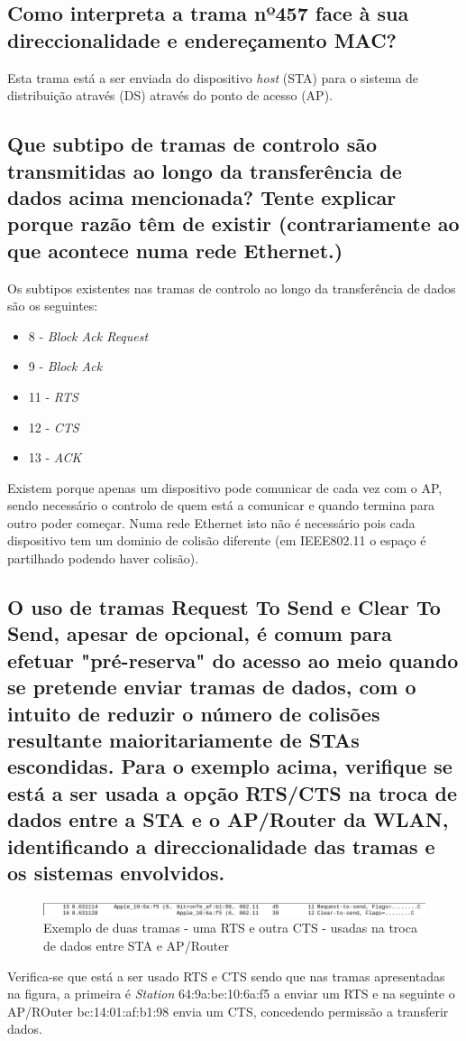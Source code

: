 \documentclass[a4paper]{article}
\begin{document}
\subsection{Como interpreta a trama nº457 face à sua direccionalidade e endereçamento
MAC?}
Esta trama está a ser enviada do dispositivo \textit{host} (STA) para o sistema de distribuição através (DS) através do ponto de acesso (AP).

\subsection{Que subtipo de tramas de controlo são transmitidas ao longo da transferência de
dados acima mencionada? Tente explicar porque razão têm de existir
(contrariamente ao que acontece numa rede Ethernet.)}
Os subtipos existentes nas tramas de controlo ao longo da transferência de dados são os seguintes:
\begin{itemize}
    \item 8 - \textit{Block Ack Request}
    \item 9 - \textit{Block Ack}
    \item 11 - \textit{RTS}
    \item 12 - \textit{CTS}
    \item 13 - \textit{ACK}
\end{itemize}
Existem porque apenas um dispositivo pode comunicar de cada vez com o AP, sendo necessário o controlo de quem está a comunicar e quando termina para outro poder começar. Numa rede Ethernet isto não é necessário pois cada dispositivo tem um dominio de colisão diferente (em IEEE802.11 o espaço é partilhado podendo haver colisão).


\subsection{O uso de tramas Request To Send e Clear To Send, apesar de opcional, é comum
para efetuar "pré-reserva" do acesso ao meio quando se pretende enviar tramas
de dados, com o intuito de reduzir o número de colisões resultante
maioritariamente de STAs escondidas. Para o exemplo acima, verifique se está a
ser usada a opção RTS/CTS na troca de dados entre a STA e o AP/Router da
WLAN, identificando a direccionalidade das tramas e os sistemas envolvidos.}
\begin{figure}[H]
\centering
\includegraphics[scale=0.5]{pics/p18.png}
\caption{Exemplo de duas tramas - uma RTS e outra CTS - usadas na troca de dados entre STA e AP/Router}
\end{figure}
Verifica-se que está a ser usado RTS e CTS sendo que nas tramas apresentadas na figura, a primeira é \textit{Station} 64:9a:be:10:6a:f5 a enviar um RTS e na seguinte o AP/ROuter bc:14:01:af:b1:98 envia um CTS, concedendo permissão a transferir dados.
\end{document}
